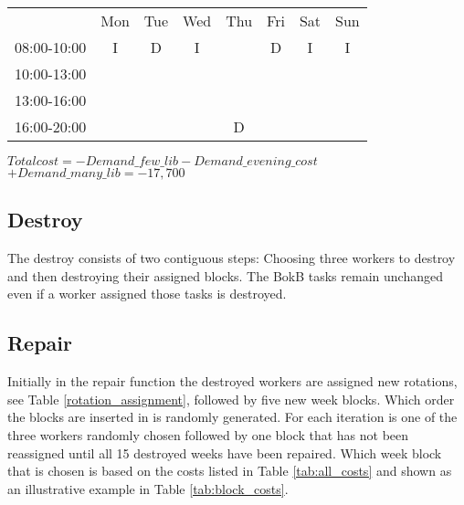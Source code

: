 \begin{table}[!h]
\begin{tabular}{cccccccc}
                                 & Mon                                             & Tue                    & Wed                                            & Thu                    & Fri                                            & Sat                    & Sun                    \\ \cline{2-8} 
\multicolumn{1}{c|}{08:00-10:00} & \multicolumn{1}{c|}{I} & \multicolumn{1}{c|}{\cellcolor[HTML]{FCFF2F}D} & \multicolumn{1}{c|}{I} & \multicolumn{1}{c|}{} & \multicolumn{1}{c|}{\cellcolor[HTML]{FCFF2F}D} & \multicolumn{1}{c|}{I} & \multicolumn{1}{c|}{I} \\ \cline{2-8} 
\multicolumn{1}{c|}{10:00-13:00} & \multicolumn{1}{c|}{}   & \multicolumn{1}{c|}{}  & \multicolumn{1}{c|}{} & \multicolumn{1}{c|}{}  & \multicolumn{1}{c|}{} &     &   \\ \cline{2-6}
\multicolumn{1}{c|}{13:00-16:00} & \multicolumn{1}{c|}{}   & \multicolumn{1}{c|}{}  & \multicolumn{1}{c|}{} & \multicolumn{1}{c|}{}  & \multicolumn{1}{c|}{}         &            &          \\ \cline{2-6}
\multicolumn{1}{c|}{16:00-20:00} & \multicolumn{1}{c|}{}  & \multicolumn{1}{c|}{}  & \multicolumn{1}{c|}{} & \multicolumn{1}{c|}{\cellcolor[HTML]{FCFF2F}D}  & \multicolumn{1}{c|}{} &         &         \\ \cline{2-6}
\end{tabular} 
\newline
$Total cost = -Demand\_few\_lib - Demand\_evening\_cost$
$+ Demand\_many\_lib = -17,700$

\end{table}



\subsection{Destroy}
The destroy consists of two contiguous steps: Choosing three workers to destroy and then destroying their assigned blocks. The BokB tasks remain unchanged even if a worker assigned those tasks is destroyed. 
\subsection{Repair}
Initially in the repair function the destroyed workers are assigned new rotations, see Table \ref{rotation_assignment}, followed by five new week blocks. Which order the blocks are inserted in is randomly generated. For each iteration is one of the three workers randomly chosen followed by one block that has not been reassigned until all 15 destroyed weeks have been repaired. Which week block that is chosen is based on the costs listed in Table \ref{tab:all_costs} and shown as an illustrative example in Table \ref{tab:block_costs}.
